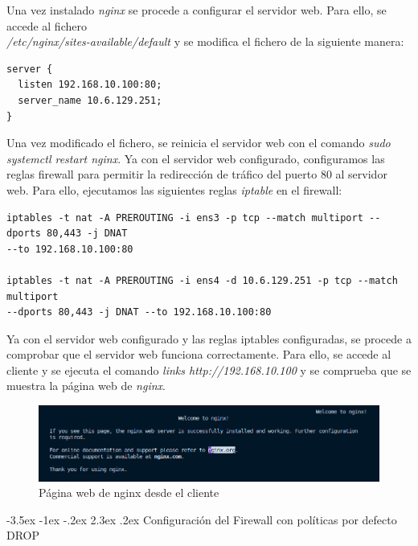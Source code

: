 \documentclass[11pt]{report} %
\makeatletter
\renewcommand\chapter{\@startsection{chapter}{0}{\z@}%
    {-3.5ex \@plus -1ex \@minus -.2ex}%
    {2.3ex \@plus.2ex}%
    {\normalfont\Large\bfseries}}
\makeatother
\begin{document}
Una vez instalado \emph{nginx} se procede a configurar el servidor web. Para ello, se accede al fichero \\
\emph{/etc/nginx/sites-available/default} y se modifica el fichero de la siguiente manera:

\begin{verbatim}
server {
  listen 192.168.10.100:80;
  server_name 10.6.129.251;
}
\end{verbatim}

Una vez modificado el fichero, se reinicia el servidor web con el comando \emph{sudo systemctl restart nginx}. Ya 
con el servidor web configurado, configuramos las reglas firewall para permitir la redirección de tráfico del puerto
80 al servidor web. Para ello, ejecutamos las siguientes reglas \emph{iptable} en el firewall:

\begin{verbatim}
iptables -t nat -A PREROUTING -i ens3 -p tcp --match multiport --dports 80,443 -j DNAT 
--to 192.168.10.100:80

iptables -t nat -A PREROUTING -i ens4 -d 10.6.129.251 -p tcp --match multiport 
--dports 80,443 -j DNAT --to 192.168.10.100:80
\end{verbatim}

Ya con el servidor web configurado y las reglas iptables configuradas, se procede a comprobar que el servidor web
funciona correctamente. Para ello, se accede al cliente y se ejecuta el comando \emph{links http://192.168.10.100}
y se comprueba que se muestra la página web de \emph{nginx}.

\begin{figure}[H]
  \centering
  \includegraphics[scale=0.4]{img/nginx_cliente.png}
  \caption{Página web de nginx desde el cliente}
  \label{fig:página web de nginx desde el cliente}
\end{figure}

\cleardoublepage

\chapter{Configuración del Firewall con políticas por defecto DROP}
\end{document}
